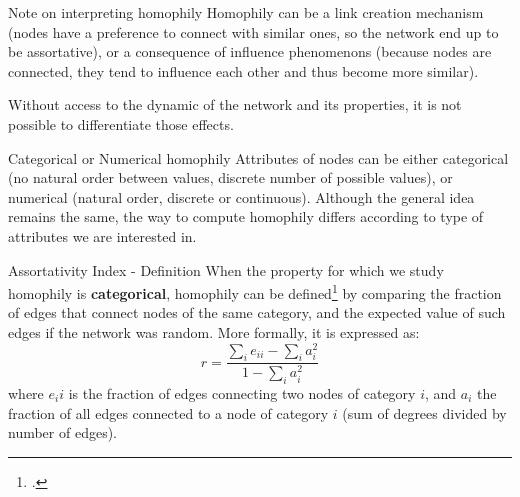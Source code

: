 \begin{textbox}{Note on interpreting homophily}
    Homophily can be a link creation mechanism (nodes have a preference to connect with similar ones, so the network end up to be assortative), or a consequence of influence phenomenons (because nodes are connected, they tend to influence each other and thus become more similar).

    Without access to the dynamic of the network and its properties, it is not possible to differentiate those effects.
\end{textbox}


\begin{textbox}{Categorical or Numerical homophily}
    Attributes of nodes can be either categorical (no natural order between values, discrete number of possible values), or numerical (natural order, discrete or continuous). Although the general idea remains the same, the way to compute homophily differs according to type of attributes we are interested in.
\end{textbox}


\begin{textbox}{Assortativity Index - Definition}
    When the property for which we study homophily is \textbf{categorical}, homophily can be defined\footcite{newman2003mixing} by comparing the fraction of edges that connect nodes of the same category, and the expected value of such edges if the network was random. More formally, it is expressed as:
    \[
        r=\frac{\sum_i e_{ii} - \sum_i a_i^2}{1- \sum_i a_i^2}
    \]
    where $e_ii$ is the fraction of edges connecting two nodes of category $i$, and $a_i$ the fraction of all edges connected to a node of category $i$ (sum of degrees divided by number of edges).
\end{textbox}


